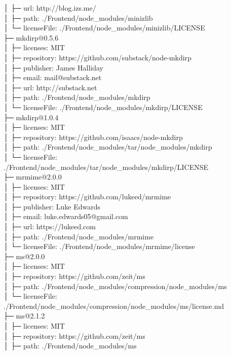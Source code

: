 │  ├─ url: http://blog.izs.me/\\
│  ├─ path: ./Frontend/node\_modules/minizlib\\
│  └─ licenseFile: ./Frontend/node\_modules/minizlib/LICENSE\\
├─ mkdirp@0.5.6\\
│  ├─ licenses: MIT\\
│  ├─ repository: https://github.com/substack/node-mkdirp\\
│  ├─ publisher: James Halliday\\
│  ├─ email: mail@substack.net\\
│  ├─ url: http://substack.net\\
│  ├─ path: ./Frontend/node\_modules/mkdirp\\
│  └─ licenseFile: ./Frontend/node\_modules/mkdirp/LICENSE\\
├─ mkdirp@1.0.4\\
│  ├─ licenses: MIT\\
│  ├─ repository: https://github.com/isaacs/node-mkdirp\\
│  ├─ path: ./Frontend/node\_modules/tar/node\_modules/mkdirp\\
│  └─ licenseFile: ./Frontend/node\_modules/tar/node\_modules/mkdirp/LICENSE\\
├─ mrmime@2.0.0\\
│  ├─ licenses: MIT\\
│  ├─ repository: https://github.com/lukeed/mrmime\\
│  ├─ publisher: Luke Edwards\\
│  ├─ email: luke.edwards05@gmail.com\\
│  ├─ url: https://lukeed.com\\
│  ├─ path: ./Frontend/node\_modules/mrmime\\
│  └─ licenseFile: ./Frontend/node\_modules/mrmime/license\\
├─ ms@2.0.0\\
│  ├─ licenses: MIT\\
│  ├─ repository: https://github.com/zeit/ms\\
│  ├─ path: ./Frontend/node\_modules/compression/node\_modules/ms\\
│  └─ licenseFile: ./Frontend/node\_modules/compression/node\_modules/ms/license.md\\
├─ ms@2.1.2\\
│  ├─ licenses: MIT\\
│  ├─ repository: https://github.com/zeit/ms\\
│  ├─ path: ./Frontend/node\_modules/ms\\
